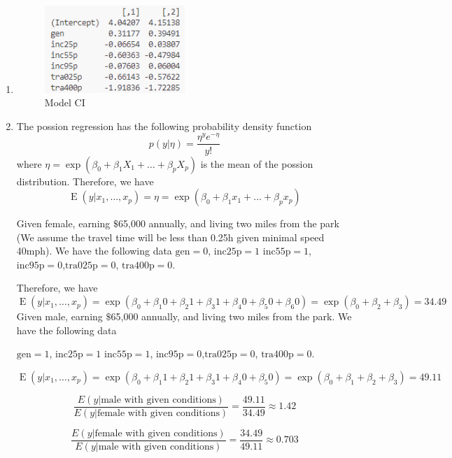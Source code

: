 \documentclass{article}
\DeclareMathOperator{\E}{E}
\begin{document}
\begin{enumerate}[label=(\alph*)]
  \item
  \begin{figure}[h]
      \centering
      \includegraphics[width=0.5\textwidth]{1e.png}
      \caption{Model CI}
  \end{figure}
  \item
    The possion regression has the following probability density function
    \[
      p(y|\eta) = \frac{\eta^y e^{-\eta}}{y!}
    \]
    where $\eta = \exp(\beta_0 + \beta_1 X_1 + \ldots + \beta_p X_p)$ is the mean of the possion distribution. Therefore, we have
    \[
      \E(y|x_1, \ldots, x_p) = \eta = \exp(\beta_0 + \beta_1 x_1 + \ldots + \beta_p x_p)
    \]

    Given female, earning \(\$\)65,000 annually, and living two miles from the park (We assume the travel time will be less than 0.25h given minimal speed 40mph). We have the following data
    \(\text{gen} = 0\), \(\text{inc25p} = 1\) \(\text{inc55p} = 1\), \(\text{inc95p} = 0\),\(\text{tra025p} = 0\), \(\text{tra400p} = 0\).

    Therefore, we have
    \[
      \E(y|x_1, \ldots, x_p) = \exp(\beta_0 + \beta_1 0 + \beta_2 1 + \beta_3 1 + \beta_4 0 + \beta_5 0 + \beta_6 0) = \exp(\beta_0 + \beta_2 + \beta_3) = 34.49
    \]
    Given male, earning \(\$\)65,000 annually, and living two miles from the park. We have the following data

    \(\text{gen} = 1\), \(\text{inc25p} = 1\) \(\text{inc55p} = 1\), \(\text{inc95p} = 0\),\(\text{tra025p} = 0\), \(\text{tra400p} = 0\).

    \[
      \E(y|x_1, \ldots, x_p) = \exp(\beta_0 + \beta_1 1 + \beta_2 1 + \beta_3 1 + \beta_4 0 + \beta_5 0) = \exp(\beta_0 + \beta_1 + \beta_2 + \beta_3) = 49.11
    \]

    \[\frac{E(y|\text{male with given conditions})}{E(y|\text{female with given conditions})} = \frac{49.11}{34.49} \approx 1.42\]

    \[\frac{E(y|\text{female with given conditions})}{E(y|\text{male with given conditions})} = \frac{34.49}{49.11} \approx 0.703\]

\end{enumerate}
\end{document}
